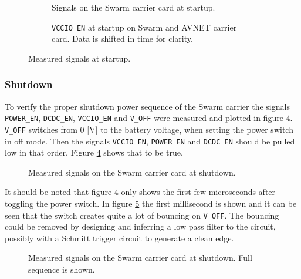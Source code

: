 \begin{figure}[h]
\centering
\begin{subfigure}[t]{.45\textwidth}
  \centering
    
  \caption{Signals on the Swarm carrier card at startup.}
  \label{fig:startup_swarm}
\end{subfigure}%
\hfill
\begin{subfigure}[t]{.45\textwidth}
  \centering
  
  \caption{\texttt{VCCIO\_EN} at startup on Swarm and AVNET carrier card. Data is shifted in time for clarity.}
  \label{fig:startup_vccioen}
\end{subfigure}
\caption{Measured signals at startup.}
\label{fig:startup_plot}
\end{figure}

\subsubsection*{Shutdown}
To verify the proper shutdown power sequence of the Swarm carrier the signals \texttt{POWER\_EN}, \texttt{DCDC\_EN}, \texttt{VCCIO\_EN} and \texttt{V\_OFF} were measured and plotted in figure \ref{fig:shutdown}.
\texttt{V\_OFF} switches from 0 [V] to the battery voltage, when setting the power switch in off mode.
Then the signals \texttt{VCCIO\_EN}, \texttt{POWER\_EN} and \texttt{DCDC\_EN} should be pulled low in that order.
Figure \ref{fig:shutdown} shows that to be true.


\begin{figure}[h]
	\centering
    
	\caption{Measured signals on the Swarm carrier card at shutdown.}
	\label{fig:shutdown}
\end{figure}
It should be noted that figure \ref{fig:shutdown} only shows the first few microseconds after toggling the power switch.
In figure \ref{fig:shutdown_bounce} the first millisecond is shown and it can be seen that the switch creates quite a lot of bouncing on \texttt{V\_OFF}.
The bouncing could be removed by designing and inferring a low pass filter to the circuit, possibly with a Schmitt trigger circuit to generate a clean edge.

\begin{figure}[h]
	\centering
    
	\caption{Measured signals on the Swarm carrier card at shutdown. Full sequence is shown.}
	\label{fig:shutdown_bounce}
\end{figure}

